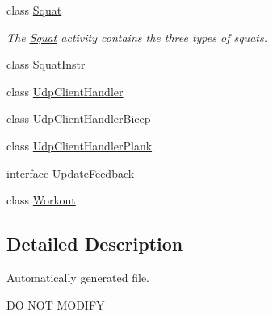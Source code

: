 \begin{DoxyCompactItemize}
\item 
class \mbox{\hyperlink{classcom_1_1example_1_1trainawearapplication_1_1_squat}{Squat}}
\begin{DoxyCompactList}\small\item\em The \mbox{\hyperlink{classcom_1_1example_1_1trainawearapplication_1_1_squat}{Squat}} activity contains the three types of squats. \end{DoxyCompactList}\item 
class \mbox{\hyperlink{classcom_1_1example_1_1trainawearapplication_1_1_squat_instr}{Squat\+Instr}}
\item 
class \mbox{\hyperlink{classcom_1_1example_1_1trainawearapplication_1_1_udp_client_handler}{Udp\+Client\+Handler}}
\item 
class \mbox{\hyperlink{classcom_1_1example_1_1trainawearapplication_1_1_udp_client_handler_bicep}{Udp\+Client\+Handler\+Bicep}}
\item 
class \mbox{\hyperlink{classcom_1_1example_1_1trainawearapplication_1_1_udp_client_handler_plank}{Udp\+Client\+Handler\+Plank}}
\item 
interface \mbox{\hyperlink{interfacecom_1_1example_1_1trainawearapplication_1_1_update_feedback}{Update\+Feedback}}
\item 
class \mbox{\hyperlink{classcom_1_1example_1_1trainawearapplication_1_1_workout}{Workout}}
\end{DoxyCompactItemize}


\subsection{Detailed Description}
Automatically generated file. 

DO N\+OT M\+O\+D\+I\+FY 